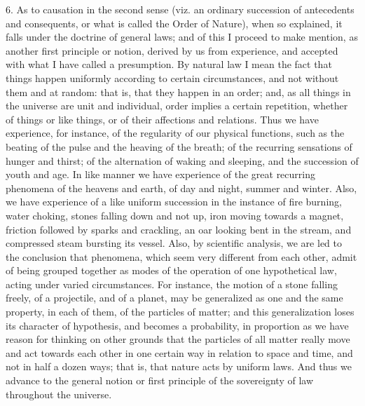 6. As to causation in the second sense (viz. an ordinary succession
of antecedents and consequents, or what is called the Order of
Nature), when so explained, it falls under the doctrine of general
laws; and of this I proceed to make mention, as another first
principle or notion, derived by us from experience, and accepted with
what I have called a presumption. By natural law I mean the fact that
things happen uniformly according to certain circumstances, and
not without them and at random: that is, that they happen in an order;
and, as all things in the universe are unit and individual, order
implies a certain repetition, whether of things or like things, or of
their affections and relations. Thus we have experience, for instance,
of the regularity of our physical functions, such as the beating of
the pulse and the heaving of the breath; of the recurring sensations
of hunger and thirst; of the alternation of waking and sleeping, and
the succession of youth and age. In like manner we have experience of
the great recurring phenomena of the heavens and earth, of day and
night, summer and winter. Also, we have experience of a like uniform
succession in the instance of fire burning, water choking, stones
falling down and not up, iron moving towards a magnet, friction
followed by sparks and crackling, an oar looking bent in the stream,
and compressed steam bursting its vessel. Also, by scientific
analysis, we are led to the conclusion that phenomena, which seem very
different from each other, admit of being grouped together as modes of
the operation of one hypothetical law, acting under varied
circumstances. For instance, the motion of a stone falling freely, of
a projectile, and of a planet, may be generalized as one and the same
property, in each of them, of the particles of matter; and this
generalization loses its character of hypothesis, and becomes a
probability, in proportion as we have reason for thinking on other
grounds that the particles of all matter really move and act towards
each other in one certain way in relation to space and time, and not
in half a dozen ways; that is, that nature acts by uniform laws.
And thus we advance to the general notion or first principle of the
sovereignty of law throughout the universe.

